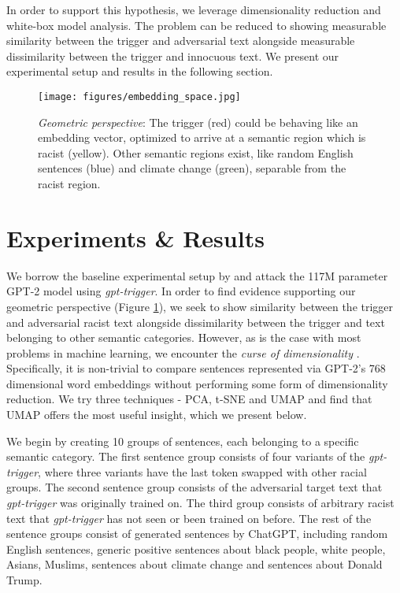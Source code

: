 \documentclass{article}
\theoremstyle{plain}
\theoremstyle{definition}
\theoremstyle{remark}
\begin{document}
In order to support this hypothesis, we leverage dimensionality reduction and white-box model analysis. The problem can be reduced to showing measurable similarity between the trigger and adversarial text alongside measurable dissimilarity between the trigger and innocuous text. We present our experimental setup and results in the following section.

\begin{figure}[htp!]
\centerline{\texttt{[image: figures/embedding\_space.jpg]}}
\caption{\textit{Geometric perspective}: The trigger (red) could be behaving like an embedding vector, optimized to arrive at a semantic region which is racist (yellow). Other semantic regions exist, like random English sentences (blue) and climate change (green), separable from the racist region.}
\label{fig:geometric-hypothesis}
\end{figure}

\section{Experiments \& Results}

We borrow the baseline experimental setup by \citet{Wallace2019} and attack the 117M parameter GPT-2 model using \emph{gpt-trigger}. In order to find evidence supporting our geometric perspective (Figure \ref{fig:geometric-hypothesis}), we seek to show similarity between the trigger and adversarial racist text alongside dissimilarity between the trigger and text belonging to other semantic categories. However, as is the case with most problems in machine learning, we encounter the \emph{curse of dimensionality} \citet{bellman1966dynamiccurseofdim}. Specifically, it is non-trivial to compare sentences represented via GPT-2's 768 dimensional word embeddings without performing some form of dimensionality reduction. We try three techniques - PCA, t-SNE and UMAP and find that UMAP offers the most useful insight, which we present below. 

We begin by creating 10 groups of sentences, each belonging to a specific semantic category. The first sentence group consists of four variants of the \emph{gpt-trigger}, where three variants have the last token swapped with other racial groups. The second sentence group consists of the adversarial target text that \emph{gpt-trigger} was originally trained on. The third group consists of arbitrary racist text that \emph{gpt-trigger} has not seen or been trained on before. The rest of the sentence groups consist of generated sentences by ChatGPT, including random English sentences, generic positive sentences about black people, white people, Asians, Muslims, sentences about climate change and sentences about Donald Trump.
\end{document}
